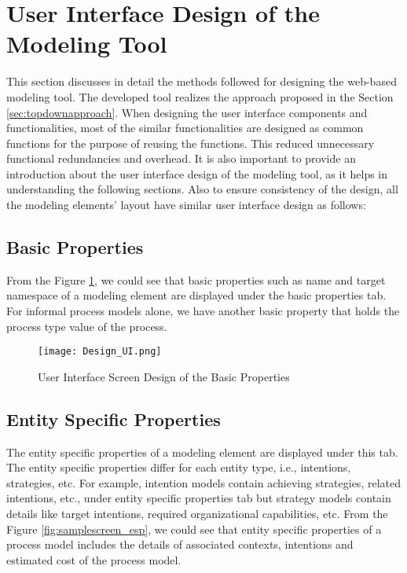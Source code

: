 \section{User Interface Design of the Modeling Tool}
\label{sec:designmethodology}
This section discusses in detail the methods followed for designing the web-based modeling tool. The developed tool realizes the approach proposed in the Section \ref{sec:topdownapproach}. When designing the user interface components and functionalities, most of the similar functionalities are designed as common functions for the purpose of reusing the functions. This reduced unnecessary functional redundancies and overhead. It is also important to provide an introduction about the user interface design of the modeling tool, as it helps in understanding the following sections. Also to ensure consistency of the design, all the modeling elements' layout have similar user interface design as follows:



\subsection{Basic Properties}
From the Figure \ref{fig:samplescreen}, we could see that basic properties such as name and target namespace of a modeling element are displayed under the basic properties tab. For informal process models alone, we have another basic property that holds the process type value of the process. 

\begin{figure}[H]
	\centering
	\texttt{[image: Design\_UI.png]}
	\caption{User Interface Screen Design of the Basic Properties}
	\label{fig:samplescreen}
\end{figure}

\subsection{Entity Specific Properties}
The entity specific properties of a modeling element are displayed under this tab. The entity specific properties differ for each entity type, i.e., intentions, strategies, etc. For example, intention models contain achieving strategies, related intentions, etc., under entity specific properties tab but strategy models contain details like target intentions, required organizational capabilities, etc. From the Figure \ref{fig:samplescreen_esp}, we could see that entity specific properties of a process model includes the details of associated contexts, intentions and estimated cost of the process model.

